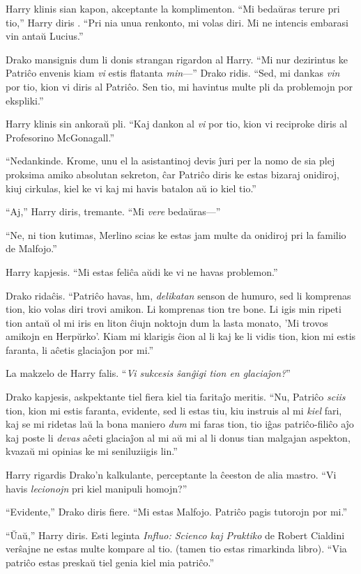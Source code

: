 Harry klinis sian kapon, akceptante la komplimenton. ``Mi bedaŭras
terure pri tio,'' Harry diris . ``Pri nia unua renkonto, mi volas
diri. Mi ne intencis embarasi vin antaŭ Lucius.''

Drako mansignis dum li donis strangan rigardon al Harry. ``Mi nur
dezirintus ke Patriĉo envenis kiam \emph{vi} estis flatanta
\emph{min}—'' Drako ridis. ``Sed, mi dankas \emph{vin} por tio, kion
vi diris al Patriĉo. Sen tio, mi havintus multe pli da problemojn por
ekspliki.''

Harry klinis sin ankoraŭ pli. ``Kaj dankon al \emph{vi} por tio, kion
vi reciproke diris al Profesorino McGonagall.''

``Nedankinde. Krome, unu el la asistantinoj devis ĵuri per la nomo de
sia plej proksima amiko absolutan sekreton, ĉar Patriĉo diris ke estas
bizaraj onidiroj, kiuj cirkulas, kiel ke vi kaj mi havis batalon aŭ
io kiel tio.''

``Aj,'' Harry diris, tremante. ``Mi \emph{vere} bedaŭras—''

``Ne, ni tion kutimas, Merlino scias ke estas jam multe da onidiroj
pri la familio de Malfojo.''


Harry kapjesis. ``Mi estas feliĉa aŭdi ke vi ne havas problemon.''

Drako ridaĉis. ``Patriĉo havas, hm, \emph{delikatan} senson de humuro,
sed li komprenas tion, kio volas diri trovi amikon. Li komprenas tion
tre bone. Li igis min ripeti tion antaŭ ol mi iris en liton ĉiujn
noktojn dum la lasta monato, 'Mi trovos amikojn en Herpŭrko'. Kiam mi
klarigis ĉion al li kaj ke li vidis tion, kion mi estis faranta, li
aĉetis glaciaĵon por mi.''

La makzelo de Harry falis. ``\emph{Vi sukcesis ŝanĝigi tion en glaciaĵon?}''

Drako kapjesis, askpektante tiel fiera kiel tia faritaĵo
meritis. ``Nu, Patriĉo \emph{sciis} tion, kion mi estis faranta,
evidente, sed li estas tiu, kiu instruis al mi \emph{kiel} fari, kaj
se mi ridetas laŭ la bona maniero \emph{dum} mi faras tion, tio iĝas
patriĉo-filiĉo aĵo kaj poste li \emph{devas} aĉeti glaciaĵon al mi aŭ
mi al li donus tian malgajan aspekton, kvazaŭ mi opinias ke mi
seniluziigis lin.''

Harry rigardis Drako'n kalkulante, perceptante la ĉeeston de alia
mastro. ``Vi havis \emph{lecionojn} pri kiel manipuli homojn?''

``Evidente,'' Drako diris fiere. ``Mi estas Malfojo. Patriĉo pagis tutorojn por
mi.''

``Ŭaŭ,'' Harry diris. Esti leginta \emph{Influo: Scienco kaj Praktiko}
de Robert Cialdini verŝajne ne estas multe kompare al tio. (tamen tio
estas rimarkinda libro). ``Via patriĉo estas preskaŭ tiel genia kiel mia
patriĉo.''

